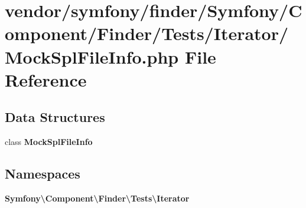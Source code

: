 \section{vendor/symfony/finder/\+Symfony/\+Component/\+Finder/\+Tests/\+Iterator/\+Mock\+Spl\+File\+Info.php File Reference}
\label{_mock_spl_file_info_8php}
\subsection*{Data Structures}
\begin{DoxyCompactItemize}
\item 
class {\bf Mock\+Spl\+File\+Info}
\end{DoxyCompactItemize}
\subsection*{Namespaces}
\begin{DoxyCompactItemize}
\item 
 {\bf Symfony\textbackslash{}\+Component\textbackslash{}\+Finder\textbackslash{}\+Tests\textbackslash{}\+Iterator}
\end{DoxyCompactItemize}
